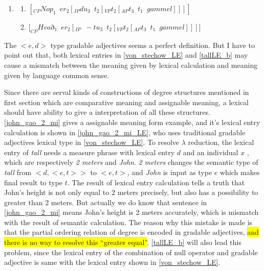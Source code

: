 \documentclass{ctexart}
\begin{document}
\begin{enumerate}
    \item \label{Icelandic_example_LE}
    
    \begin{enumerate}
        \item $[_{CP}Nop_1 \enspace er_2[_{IP}du_3 \enspace t_2[_{VP} t_2[_{AP} t_3 \enspace t_1 \enspace gammel]]]]$
        
        \item $[_{CP}Hva$ð$_1 \enspace er_2[_{IP} \enspace -tu_3 \enspace t_2 [_{VP}t_2[_{AP}t_3 \enspace t_1 \enspace gammel]]]]$
        
    \end{enumerate}   
    
\end{enumerate}

The $<e,d>$ type gradable adjectives seems a perfect definition. But I have to point out that, both lexical entries in \ref{von_stechow_LE} and \ref{tallLE_b} may cause a mismatch between the meaning given by lexical calculation and meaning given by language common sense. 

Since there are serval kinds of constructions of degree structures mentioned in first section which are comparative meaning and assignable meaning, a lexical should have ability to give a interpretation of all these structures. \ref{john_gao_2_mi} gives a assignable meaning form example, and it's lexical entry calculation is shown in \ref{john_gao_2_mi_LE}, who uses traditional gradable adjectives lexical type in \ref{von_stechow_LE}. To resolve $\lambda$ reduction, the lexical entry of \textit{tall} needs a measure phrase with lexical entry $d$ and an individual $x$ , which are respectively \textit{2 meters} and \textit{John}. \textit{2 meters} changes the semantic type of \textit{tall} from $<d,<e,t>>$ to $<e,t>$, and \textit{John} is input as type $e$ which makes final result to type $t$. The result of lexical entry calculation tells a truth that John's height is not only equal to 2 meters precisely, but also has a possibility to greater than 2 meters. But actually we do know that sentence in \ref{john_gao_2_mi} means John's height is 2 meters accurately, which is mismatch with the result of semantic calculation. The reason why this mistake is made is that the partial ordering relation of degree is encoded in gradable adjectives, \colorbox{yellow}{and there is no way to resolve this ``greater equal''}. \ref{tallLE_b} will also lead this problem, since the lexical entry of the combination of null operator and gradable adjective is same with the lexical entry shown in \ref{von_stechow_LE}.
\end{document}
